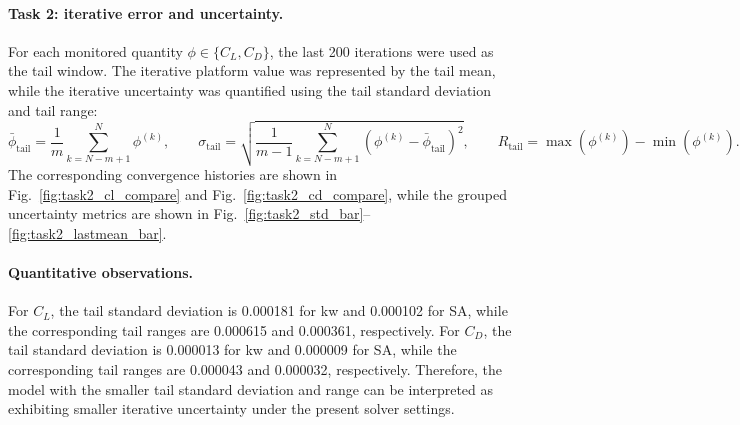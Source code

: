 \paragraph{Task 2: iterative error and uncertainty.}
For each monitored quantity $\phi\in\{C_L,C_D\}$, the last 200 iterations were used as the tail window. The iterative platform value was represented by the tail mean, while the iterative uncertainty was quantified using the tail standard deviation and tail range:
\begin{equation}
\bar{\phi}_{\mathrm{tail}}=\frac{1}{m}\sum_{k=N-m+1}^{N}\phi^{(k)},
\qquad
\sigma_{\mathrm{tail}}=\sqrt{\frac{1}{m-1}\sum_{k=N-m+1}^{N}\left(\phi^{(k)}-\bar{\phi}_{\mathrm{tail}}\right)^2},
\qquad
R_{\mathrm{tail}}=\max(\phi^{(k)})-\min(\phi^{(k)}).
\end{equation}
The corresponding convergence histories are shown in Fig.~\ref{fig:task2_cl_compare} and Fig.~\ref{fig:task2_cd_compare}, while the grouped uncertainty metrics are shown in Fig.~\ref{fig:task2_std_bar}--\ref{fig:task2_lastmean_bar}.
\paragraph{Quantitative observations.}
For $C_L$, the tail standard deviation is 0.000181 for kw and 0.000102 for SA, while the corresponding tail ranges are 0.000615 and 0.000361, respectively.
For $C_D$, the tail standard deviation is 0.000013 for kw and 0.000009 for SA, while the corresponding tail ranges are 0.000043 and 0.000032, respectively.
Therefore, the model with the smaller tail standard deviation and range can be interpreted as exhibiting smaller iterative uncertainty under the present solver settings.